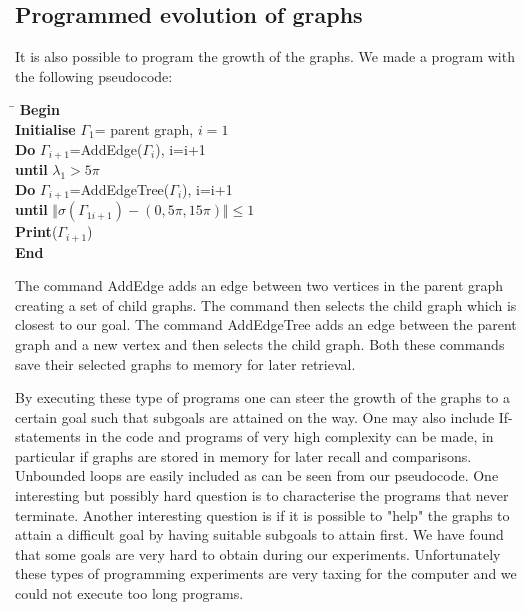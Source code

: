 \documentclass[a4paper]{article}
\begin{document}
\subsection{Programmed evolution of graphs}
It is also possible to program the growth of the graphs. We made a program with the following pseudocode:
\newline
\newline
\begin{tabbing}
\hspace{0.5cm} \=  \kill
\textbf{Begin}\\ 
\textbf{Initialise} $\Gamma_1$= parent graph, $i=1$\\  
\>  \textbf{Do} $\Gamma_{i+1}$=AddEdge($\Gamma_i$), i=i+1\\ \>\textbf{until} $\lambda_{1}>5\pi$\\
\>  \textbf{Do} $\Gamma_{i+1}$=AddEdgeTree($\Gamma_i$), i=i+1\\
\>  \textbf{until} $\Vert \sigma(\Gamma_{1i+1})-(0,5\pi,15\pi) \Vert \leq 1$\\
  \textbf{Print}($\Gamma_{i+1}$)\\
  \textbf{End}\\
\end{tabbing}  

The command AddEdge adds an edge between two vertices in the parent graph creating a set of child graphs. The command then selects the child graph which is closest to our goal. The command AddEdgeTree adds an edge between the parent graph and a new vertex and then selects the child graph. Both these commands save their selected graphs to memory for later retrieval.

By executing these type of programs one can steer the growth of the graphs to a certain goal such that subgoals are attained on the way. One may also include If-statements in the code and programs of very high complexity can be made, in particular if graphs are stored in memory for later recall and comparisons. Unbounded loops are easily included as can be seen from our pseudocode. One interesting but possibly hard question is to characterise the programs that never terminate. Another interesting question is if it is possible to "help" the graphs to attain a difficult goal by having suitable subgoals to attain first. We have found that some goals are very hard to obtain during our experiments. Unfortunately these types of programming experiments are very taxing for the computer and we could not execute too long programs.
\end{document}
